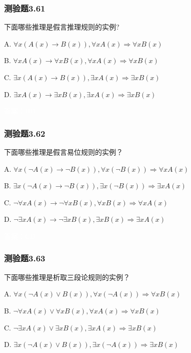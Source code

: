 \documentclass[UTF8, heading=true]{ctexart}
\begin{document}
\subsubsection{测验题3.61}

下面哪些推理是假言推理规则的实例?

A. $\forall x(A(x) \rightarrow B(x)),  \forall x A(x) \Longrightarrow \forall x B(x)$

B. $\forall x A(x) \rightarrow \forall x B(x), \forall x A(x) \Longrightarrow \forall x B(x)$

C. $\exists x(A(x) \rightarrow B(x)),  \exists x A(x) \Longrightarrow \exists x B(x)$

D. $\exists x A(x) \rightarrow \exists x B(x), \exists x A(x) \Longrightarrow \exists x B(x)$

\textcolor{white}{答案：BD}


\subsubsection{测验题3.62}

下面哪些推理是假言易位规则的实例？

A. $\forall x(\neg A(x) \rightarrow \neg B(x)),  \forall x(\neg B(x)) \Longrightarrow \forall x A(x)$

B. $\exists x(\neg A(x) \rightarrow \neg B(x)),  \exists x(\neg B(x)) \Longrightarrow \exists x A(x)$

C. $\neg \forall x A(x) \rightarrow \neg \forall x B(x), \forall x B(x) \Longrightarrow \forall x A(x)$

D. $\neg \exists x A(x) \rightarrow \neg \exists x B(x),  \exists x B(x) \Longrightarrow \exists x A(x)$

\textcolor{white}{答案：CD}

\subsubsection{测验题3.63}

下面哪些推理是析取三段论规则的实例？

A. $\forall x(\neg A(x) \vee B(x)),  \forall x(\neg A(x)) \Longrightarrow \forall x B(x)$

B. $\neg \forall x A(x) \vee \forall x B(x),  \forall x A(x) \Longrightarrow \forall x B(x)$

C. $\neg \exists x A(x) \vee \exists x B(x), \exists x A(x) \Longrightarrow \exists x B(x)$

D. ${\exists x}(\neg A(x) \vee B(x)),  \exists x(\neg A(x)) \Longrightarrow \exists x B(x)$
\end{document}
